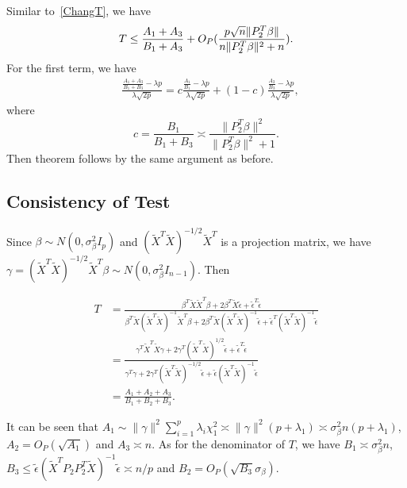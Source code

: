 \documentclass[review]{elsarticle}
\theoremstyle{plain}
\theoremstyle{definition}
\theoremstyle{remark}
\begin{document}
Similar to~\eqref{ChangT}, we have
\begin{equation}
            T\leq\frac{A_1+A_3}{B_1+A_3}+O_P(\frac{p\sqrt{n}\|P_2^T\beta\|}{n\|P_2^T\beta\|^2+n}).\\
\end{equation}
For the first term, we have
\begin{equation}
    \begin{aligned}
        &\frac{\frac{A_1+A_3}{B_1+B_3}-\lambda p}{\lambda \sqrt{2p}}
        =c\frac{\frac{A_1}{B_1}-\lambda p}{\lambda \sqrt{2p}}+
        (1-c)\frac{\frac{A_3}{B_3}-\lambda p}{\lambda \sqrt{2p}},
    \end{aligned}
\end{equation}
where 
\begin{equation}
    c=\frac{B_1}{B_1+B_3}\asymp \frac{\|P_2^T \beta\|^2}{\|P_2^T \beta\|^2+1}.
\end{equation}
Then theorem follows by the same argument as before.


\subsection{Consistency of Test}

Since $\beta\sim N(0,\sigma^2_{\beta}I_p)$ and ${(\tilde{X}^T \tilde{X})}^{-1/2}\tilde{X}^T$ is a projection matrix, we have $\gamma={(\tilde{X}^T \tilde{X})}^{-1/2}\tilde{X}^T\beta\sim N(0,\sigma^2_{\beta}I_{n-1})$. Then


\begin{equation}
    \begin{aligned}
        T&=\frac{\beta^T \tilde{X}\tilde{X}^T \beta+
        2\beta^T \tilde{X}\tilde{\epsilon}+
        \tilde{\epsilon}^T\tilde{\epsilon}
    }{\beta^T \tilde{X}{(\tilde{X}^T\tilde{X})}^{-1}\tilde{X}^T \beta+
        2\beta^T \tilde{X}{(\tilde{X}^T\tilde{X})}^{-1}\tilde{\epsilon}+
        \tilde{\epsilon}^T{(\tilde{X}^T\tilde{X})}^{-1}\tilde{\epsilon}
    }\\
        &=\frac{\gamma^T\tilde{X}^T\tilde{X}\gamma+2\gamma^T{(\tilde{X}^T\tilde{X})}^{1/2}\tilde{\epsilon}+\tilde{\epsilon}^T\tilde{\epsilon}}{\gamma^T\gamma+2\gamma^T{(\tilde{X}^T\tilde{X})}^{-1/2}\tilde{\epsilon}+\tilde{\epsilon}{(\tilde{X}^T\tilde{X})}^{-1}\tilde{\epsilon}}\\
        &=\frac{A_1+A_2+A_3}{B_1+B_2+B_3}.
    \end{aligned}
\end{equation}

It can be seen that
$A_1\sim \|\gamma\|^2\sum_{i=1}^{p}\lambda_i \chi^2_1\asymp \|\gamma\|^2 (p+\lambda_1)\asymp \sigma^2_\beta n(p+\lambda_1)$, $A_2=O_P(\sqrt{A_1})$ and $A_3\asymp n$. As for the denominator of $T$, we have $B_1\asymp \sigma^2_\beta n$, $B_3 \leq \tilde{\epsilon}{(\tilde{X}^T P_2 P_2^T\tilde{X})}^{-1}\tilde{\epsilon}\asymp n/p$ and $B_2=O_P(\sqrt{B_3}\sigma_\beta)$.
\end{document}
